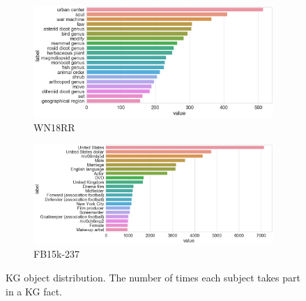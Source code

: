\begin{figure}[H]
	\begin{subfigure}[b]{.5\linewidth}
   		\centering
    		\includegraphics[width=1.0\linewidth, height=0.7\linewidth]{WN18RR_Object_Counts}
		\captionsetup{justification=centering}
		\caption{WN18RR}
	\end{subfigure}
	\begin{subfigure}[b]{.5\linewidth}
   		\centering
		\includegraphics[width=1.0\linewidth, height=0.7\linewidth]{FB15k-237_Object_Counts}
		\captionsetup{justification=centering}
		\caption{FB15k-237}
	\end{subfigure}
	\caption{KG object distribution. The number of times each subject takes part in a KG fact.}
\end{figure}

